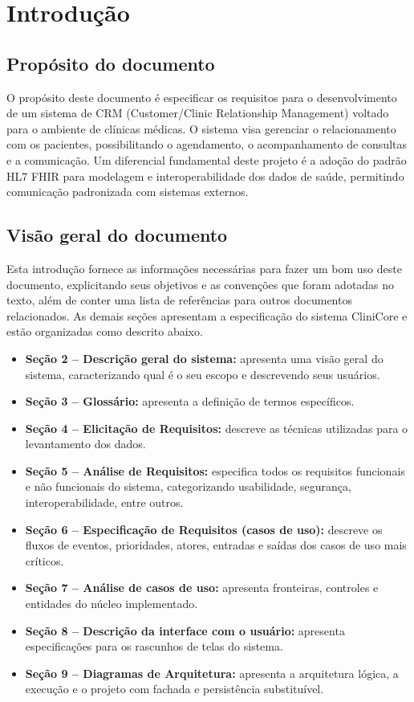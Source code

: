 \section{Introdução}
\label{sec:introducao}

\subsection{Propósito do documento}
O propósito deste documento é especificar os requisitos para o desenvolvimento de um sistema de CRM (Customer/Clinic Relationship Management) voltado para o ambiente de clínicas médicas. O sistema visa gerenciar o relacionamento com os pacientes, possibilitando o agendamento, o acompanhamento de consultas e a comunicação. Um diferencial fundamental deste projeto é a adoção do padrão HL7 FHIR para modelagem e interoperabilidade dos dados de saúde, permitindo comunicação padronizada com sistemas externos.

\subsection{Visão geral do documento}
Esta introdução fornece as informações necessárias para fazer um bom uso deste documento, explicitando seus objetivos e as convenções que foram adotadas no texto, além de conter uma lista de referências para outros documentos relacionados. As demais seções apresentam a especificação do sistema CliniCore e estão organizadas como descrito abaixo.

\begin{itemize}
    \item \textbf{Seção 2 -- Descrição geral do sistema:} apresenta uma visão geral do sistema, caracterizando qual é o seu escopo e descrevendo seus usuários.
    \item \textbf{Seção 3 -- Glossário:} apresenta a definição de termos específicos.
    \item \textbf{Seção 4 -- Elicitação de Requisitos:} descreve as técnicas utilizadas para o levantamento dos dados.
    \item \textbf{Seção 5 -- Análise de Requisitos:} especifica todos os requisitos funcionais e não funcionais do sistema, categorizando usabilidade, segurança, interoperabilidade, entre outros.
    \item \textbf{Seção 6 -- Especificação de Requisitos (casos de uso):} descreve os fluxos de eventos, prioridades, atores, entradas e saídas dos casos de uso mais críticos.
    \item \textbf{Seção 7 -- Análise de casos de uso:} apresenta fronteiras, controles e entidades do núcleo implementado.
    \item \textbf{Seção 8 -- Descrição da interface com o usuário:} apresenta especificações para os rascunhos de telas do sistema.
    \item \textbf{Seção 9 -- Diagramas de Arquitetura:} apresenta a arquitetura lógica, a execução e o projeto com fachada e persistência substituível.
\end{itemize}

